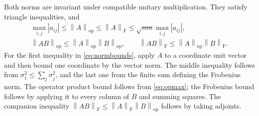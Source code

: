 \documentclass[11pt,a4paper]{article}
\numberwithin{equation}{section}
\theoremstyle{definition}
\theoremstyle{remark}
\newcommand{\op}{\mathrm{op}}
\newcommand{\Fr}{\mathrm F}
\newcommand{\norm}[1]{\left\lVert#1\right\rVert}
\begin{document}
Both norms are invariant under compatible unitary multiplication. They
satisfy triangle inequalities, and
\begin{gather}\label{eq:normbounds}
 \max_{i,j}|a_{ij}|\le\norm A_{\op}\le\norm A_{\Fr}
     \le\sqrt{mn}\max_{i,j}|a_{ij}|,\\
 \norm{AB}_{\op}\le\norm A_{\op}\norm B_{\op},\qquad
 \norm{AB}_{\Fr}\le\norm A_{\op}\norm B_{\Fr}.
 \label{eq:productbounds}
\end{gather}
For the first inequality in \eqref{eq:normbounds}, apply $A$ to a coordinate
unit vector and then bound one coordinate by the vector norm. The middle
inequality follows from $\sigma_1^2\le\sum_j\sigma_j^2$, and the last
one from the finite sum defining the Frobenius norm. The operator product
bound follows from \eqref{eq:opmax}; the Frobenius bound follows by applying
it to every column of $B$ and summing squares. The companion inequality
$\norm{AB}_{\Fr}\le\norm A_{\Fr}\norm B_{\op}$ follows by taking adjoints.
\end{document}
